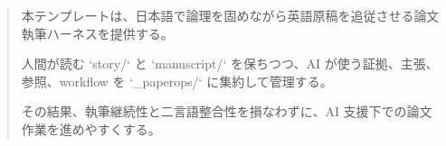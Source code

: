 \begin{abstract}
本テンプレートは、日本語で論理を固めながら英語原稿を追従させる論文執筆ハーネスを提供する。

人間が読む `story/` と `manuscript/` を保ちつつ、AI が使う証拠、主張、参照、workflow を `_paperops/` に集約して管理する。

その結果、執筆継続性と二言語整合性を損なわずに、AI 支援下での論文作業を進めやすくする。
\end{abstract}
